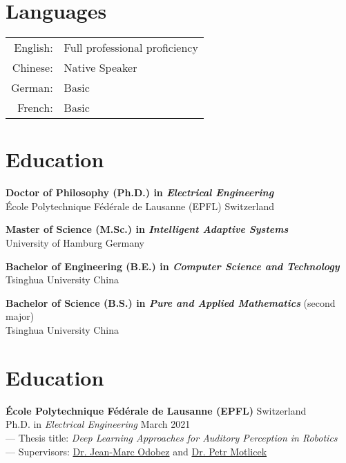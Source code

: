 \documentclass[a4paper,9pt]{extarticle} %
\newcommand{\ind}{\hspace*{1em}}
\begin{document}

\section{Languages}

\begin{tabular}{rl}
  English: & Full professional proficiency \\
  Chinese: & Native Speaker \\
  German: & Basic \\
  French: & Basic \\
\end{tabular}

\section{Education}
\parbox{\textwidth}{%
\textbf{Doctor of Philosophy (Ph.D.) in \textit{Electrical Engineering}} \\
\ind{} \'Ecole Polytechnique F\'ed\'erale de Lausanne (EPFL) \hfill Switzerland
}

\parbox{\textwidth}{%
\textbf{Master of Science (M.Sc.) in \textit{Intelligent Adaptive Systems}} \\
\ind{} University of Hamburg \hfill Germany
}

\parbox{\textwidth}{%
\textbf{Bachelor of Engineering (B.E.) in \textit{Computer Science and Technology}} \\
\ind{} Tsinghua University \hfill China
}

\parbox{\textwidth}{%
\textbf{Bachelor of Science (B.S.) in \textit{Pure and Applied Mathematics}} (second major) \\
\ind{} Tsinghua University \hfill China
}

\iffalse{}


\section{Education}
\parbox{\textwidth}{%
\textbf{\'Ecole Polytechnique F\'ed\'erale de Lausanne (EPFL)} \hfill Switzerland \\
\ind{} Ph.D. in \textit{Electrical Engineering} \hfill March 2021 \\
\ind{} --- Thesis title: \textit{Deep Learning Approaches for Auditory Perception in Robotics} \\
\ind{} --- Supervisors: \href{https://idiap.ch/~odobez}{Dr. Jean-Marc Odobez} and \href{https://people.idiap.ch/pmotlic}{Dr. Petr Motlicek}
}
\end{document}
